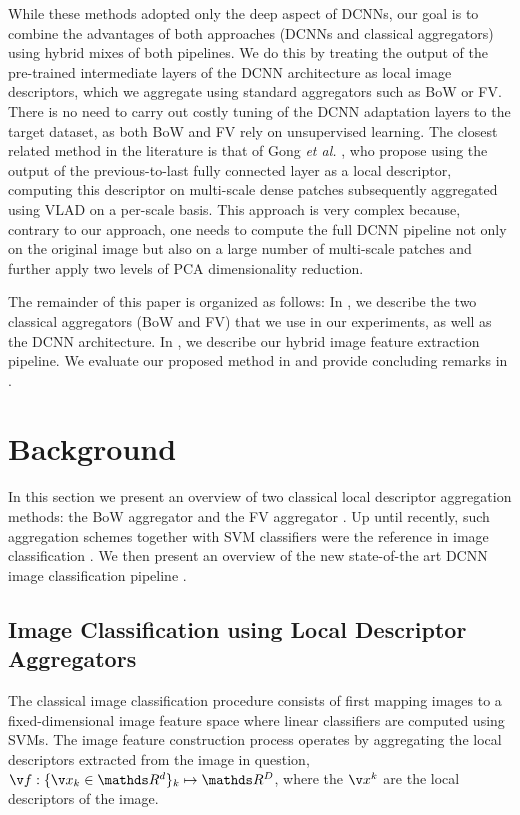 \documentclass{article}
\begin{document}
While these methods adopted only the deep aspect of DCNNs, our goal is to combine the advantages of both approaches (DCNNs and classical aggregators) using hybrid mixes of both pipelines. We do this by treating the output of the pre-trained intermediate layers of the DCNN architecture as local image descriptors, which we aggregate using standard aggregators such as BoW or FV. There is no need to carry out costly tuning of the DCNN adaptation layers \cite{Oquaba} to the target dataset, as both BoW and FV rely on unsupervised learning. The closest related method in the literature is that of Gong \textit{et al.} \cite{gong2014multi}, who propose using the output of the previous-to-last fully connected layer as a local descriptor, computing this descriptor on multi-scale dense patches subsequently aggregated using VLAD on a per-scale basis. This approach is very complex because, contrary to our approach, one needs to compute the full DCNN pipeline not only on the original image but also on a large number of multi-scale patches and further apply two levels of PCA dimensionality reduction. 



The remainder of this paper is organized as follows: In , we describe the two classical aggregators (BoW and FV) that we use in our experiments, as well as the DCNN architecture. In , we describe our hybrid image feature extraction pipeline. We evaluate our proposed method in  and provide concluding remarks in .

\section{Background}\label{background}
In this section we present an overview of two classical local descriptor aggregation methods: the BoW aggregator \cite{Sivic2003,Lazebnika,Bosch} and the FV aggregator \cite{Perronnin2010}. Up until recently, such aggregation schemes together with SVM classifiers were the reference in image classification \cite{Chatfield2011}.  We then present an overview of the new state-of-the art DCNN image classification pipeline \cite{Krizhevsky2012}. %

\subsection{Image Classification using Local Descriptor Aggregators}
The classical image classification procedure consists of first mapping images to a fixed-dimensional image feature space where linear classifiers are computed using SVMs. The image feature construction process operates by aggregating the local descriptors extracted from the image in question, $\v f: \{\v x_k \in \mathds R^d\}_k \mapsto \mathds R^D$, where the $\v x^k$ are the local descriptors of the image.
\end{document}
